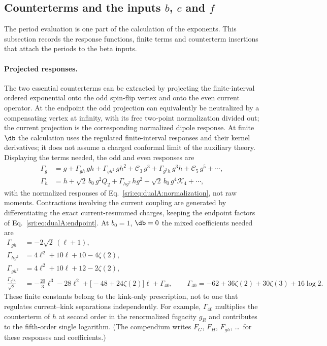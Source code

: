 \subsection{Counterterms and the inputs \texorpdfstring{$b$}{b}, \texorpdfstring{$c$}{c} and \texorpdfstring{$f$}{f}}\label{sri:app:dualB:counterterms}
The period evaluation is one part of the calculation of the exponents. This subsection records the response
functions, finite terms and counterterm insertions that attach the periods to the beta inputs.

\paragraph{Projected responses.} The two essential counterterms can be extracted by projecting the finite-interval
ordered exponential onto the odd spin-flip vertex and onto the even current operator. At the endpoint the odd
projection can equivalently be neutralized by a compensating vertex at infinity, with its free two-point
normalization divided out; the current projection is the corresponding normalized dipole response. At finite $\db$ the
calculation uses the regulated finite-interval responses and their kernel derivatives; it does not assume a charged
conformal limit of the auxiliary theory. Displaying the terms needed, the odd and even responses are
\begin{equation}
\begin{aligned}
 \Gamma_g&=g+\Gamma_{gh}\,gh+\Gamma_{gh^2}\,gh^2+\mathcal C_3\,g^3+\Gamma_{g^3h}\,g^3h+\mathcal C_5\,g^5+\cdots,\\
 \Gamma_h&=h+\sqrt2\,b_0\,g^2Q_2+\Gamma_{hg^2}\,hg^2+\sqrt2\,b_0\,g^4\mathcal K_4+\cdots,
\end{aligned}
\label{sri:eq:dualB:responsegen}
\end{equation}
with the normalized responses of Eq.~\eqref{sri:eq:dualA:normalization}, not raw moments. Contractions involving the
current coupling are generated by differentiating the exact current-resummed charges, keeping the endpoint factors of
Eq.~\eqref{sri:eq:dualA:endpoint}. At $b_0=1$, $\db=0$ the mixed coefficients needed are
\begin{equation}
\begin{aligned}
 \Gamma_{gh}&=-2\sqrt2\,(\ell+1),\\
 \Gamma_{hg^2}&=4\ell^2+10\ell+10-4\zeta(2),\\
 \Gamma_{gh^2}&=4\ell^2+10\ell+12-2\zeta(2),\\
 \frac{\Gamma_{g^3h}}{\sqrt2}&=-\frac{20}{3}\ell^3-28\ell^2+\bigl[-48+24\zeta(2)\bigr]\ell+\Gamma_{40},\qquad
 \Gamma_{40}=-62+36\zeta(2)+30\zeta(3)+16\log2.
\end{aligned}
\label{sri:eq:dualB:mixed}
\end{equation}
These finite constants belong to the kink-only prescription, not to one that regulates current--kink separations
independently. For example, $\Gamma_{40}$ multiplies the counterterm of $h$ at second order in the renormalized fugacity $g_R$ and contributes to the
fifth-order single logarithm. (The compendium writes $F_G$, $F_H$, $F_{gh}$, \dots\ for these responses and
coefficients.)

